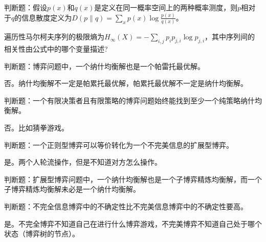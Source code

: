 \begin{problem}
	判断题：假设$p(x)$和$q(x)$是定义在同一概率空间上的两种概率测度，则$p$相对于$q$的信息散度定义为$D(p\|q)=\sum_xp(x)\log\frac{p(x)}{q(x)}$。
\end{problem}
\begin{solution}

\end{solution}


\begin{problem}
	遍历性马尔柯夫序列的极限熵为$H_\infty(X)=-\sum_{i,j}p_ip_{j,i}\log p_{j,i}$，其中序列间的相关性由公式中的哪个变量描述?
\end{problem}
\begin{solution}

\end{solution}


\begin{problem}
	判断题：博弈问题中，一个纳什均衡解也是一个帕雷托最优解。
\end{problem}
\begin{solution}
	否。纳什均衡解不一定是帕累托最优解，帕累托最优解不一定是纳什均衡解。
\end{solution}


\begin{problem}
	判断题：一个有限决策者且有限策略的博弈问题始终能找到至少一个纯策略纳什均衡解。
\end{problem}
\begin{solution}
	否。比如猜拳游戏。
\end{solution}


\begin{problem}
	判断题：一个正则型博弈可以等价转化为一个不完美信息的扩展型博弈。
\end{problem}
\begin{solution}
	是。两个人轮流操作，但是不知道对方怎么操作。
\end{solution}


\begin{problem}
	判断题：扩展型博弈问题中，一个纳什均衡解也是一个子博弈精炼均衡解，而一个子博弈精炼均衡解未必是一个纳什均衡解。
\end{problem}
\begin{solution}

\end{solution}


\begin{problem}
	判断题：不完全信息博弈中的不确定性比不完美信息博弈中的不确定性要高。
\end{problem}
\begin{solution}
	是。不完全博弈不知道自己在进行什么博弈游戏，不完美博弈不知道自己处于哪个状态（博弈树的节点）。
\end{solution}


